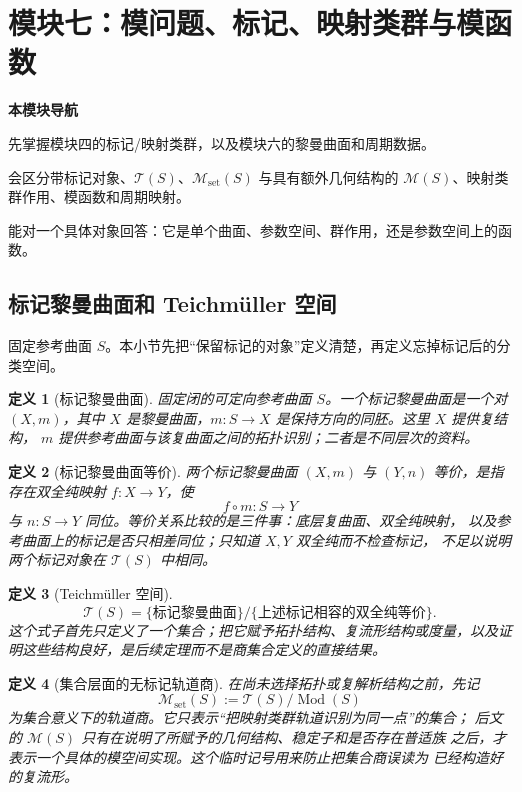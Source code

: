 \documentclass[UTF8,fontset=none,a4paper,11pt]{ctexart}
\theoremstyle{foundation-definition}
\newtheorem{definition}{定义}[section]
\theoremstyle{foundation-theorem}
\theoremstyle{foundation-proposition}
\theoremstyle{foundation-example}
\theoremstyle{foundation-remark}
\theoremstyle{foundation-theorem}
\newcommand{\T}{\mathcal T}
\newcommand{\M}{\mathcal M}
\newcommand{\Mod}{\operatorname{Mod}}
\newcommand{\moduleguide}[3]{%
\begin{mdframed}[backgroundcolor=definitionbg,linecolor=mainblue,linewidth=1.5pt,
  leftline=true,rightline=false,topline=false,bottomline=false,
  skipabove=9pt,skipbelow=10pt,innerleftmargin=10pt,innerrightmargin=8pt,
  innertopmargin=7pt,innerbottommargin=7pt]
{\sffamily\bfseries\color{mainblue}本模块导航}\par\smallskip
\begin{description}[style=nextline,leftmargin=2.8cm]
  \item[进入前] #1
  \item[本模块产出] #2
  \item[出口检查] #3
\end{description}
\end{mdframed}}
\begin{document}
\section{模块七：模问题、标记、映射类群与模函数}

\moduleguide{先掌握模块四的标记/映射类群，以及模块六的黎曼曲面和周期数据。}{会区分带标记对象、\(\T(S)\)、\(\M_{\mathrm{set}}(S)\) 与具有额外几何结构的 \(\M(S)\)、映射类群作用、模函数和周期映射。}{能对一个具体对象回答：它是单个曲面、参数空间、群作用，还是参数空间上的函数。}

\subsection{标记黎曼曲面和 Teichmüller 空间}

固定参考曲面 \(S\)。本小节先把“保留标记的对象”定义清楚，再定义忘掉标记后的分类空间。

\begin{definition}[标记黎曼曲面]\label{def:marked-riemann}
固定闭的可定向参考曲面 \(S\)。一个标记黎曼曲面是一个对 \((X,m)\)，其中
\(X\) 是黎曼曲面，\(m:S\to X\) 是保持方向的同胚。这里 \(X\) 提供复结构，
\(m\) 提供参考曲面与该复曲面之间的拓扑识别；二者是不同层次的资料。
\end{definition}

\begin{definition}[标记黎曼曲面等价]\label{def:marked-riemann-equivalence}
两个标记黎曼曲面 \((X,m)\) 与 \((Y,n)\) 等价，是指存在双全纯映射
\(f:X\to Y\)，使
\[
f\circ m:S\longrightarrow Y
\]
与 \(n:S\to Y\) 同位。等价关系比较的是三件事：底层复曲面、双全纯映射，
以及参考曲面上的标记是否只相差同位；只知道 \(X,Y\) 双全纯而不检查标记，
不足以说明两个标记对象在 \(\T(S)\) 中相同。
\end{definition}

\begin{definition}[Teichmüller 空间]\label{def:teich}
\[
\T(S)=
\{\text{标记黎曼曲面}\}/
\{\text{上述标记相容的双全纯等价}\}.
\]
这个式子首先只定义了一个集合；把它赋予拓扑结构、复流形结构或度量，以及证明这些结构良好，是后续定理而不是商集合定义的直接结果。
\end{definition}

\begin{definition}[集合层面的无标记轨道商]\label{def:set-moduli}
在尚未选择拓扑或复解析结构之前，先记
\[
\M_{\mathrm{set}}(S):=\T(S)/\Mod(S)
\]
为集合意义下的轨道商。它只表示“把映射类群轨道识别为同一点”的集合；
后文的 \(\M(S)\) 只有在说明了所赋予的几何结构、稳定子和是否存在普适族
之后，才表示一个具体的模空间实现。这个临时记号用来防止把集合商误读为
已经构造好的复流形。
\end{definition}
\end{document}
